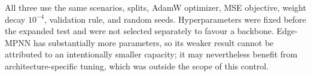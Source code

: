 \documentclass[11pt]{article}
\begin{document}
\begin{table}[H]
\centering\small
\caption{Fairness controls for the expanded architecture comparison. Parameter
counts are identical for direct and residual variants of each backbone.}
\label{tab:modelbudget}
\end{table}
All three use the same scenarios, splits, AdamW optimizer, MSE objective,
weight decay $10^{-4}$, validation rule, and random seeds. Hyperparameters were
fixed before the expanded test and were not selected separately to favour a
backbone. Edge-MPNN has substantially more parameters, so its weaker result
cannot be attributed to an intentionally smaller capacity; it may nevertheless
benefit from architecture-specific tuning, which was outside the scope of this control.
\end{document}

